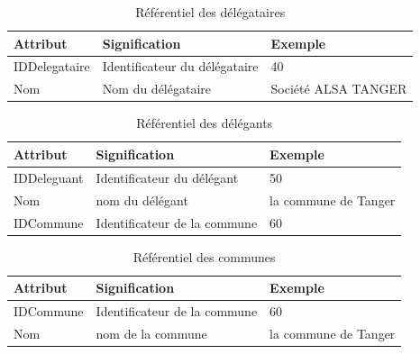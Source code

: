 \documentclass[a4paper]{report}
\begin{document}
\begin{doublespace}
	\begin{table}[H]
		\begin{center}
			\begin{tabularx}{17.5cm}{|X|X|X|}
				\hline
				\textbf{Attribut} & \textbf{Signification}        &
				\textbf{Exemple}                                                        \\
				\hline
				IDDelegataire     & Identificateur du délégataire & 40                  \\
				\hline
				Nom               & Nom du délégataire            & Société ALSA TANGER \\
				\hline
			\end{tabularx}
			\caption{Référentiel des délégataires}
		\end{center}
	\end{table}

	\begin{table}[H]
		\begin{center}
			\begin{tabularx}{17.5cm}{|X|X|X|}
				\hline
				\textbf{Attribut} & \textbf{Signification}       &
				\textbf{Exemple}                                                        \\
				\hline
				IDDeleguant       & Identificateur du délégant   & 50                   \\
				\hline
				Nom               & nom du délégant              & la commune de Tanger \\
				\hline
				IDCommune         & Identificateur de la commune & 60                   \\
				\hline
			\end{tabularx}
			\caption{Référentiel des délégants}
		\end{center}
	\end{table}

	\begin{table}[H]
		\begin{center}
			\begin{tabularx}{17.5cm}{|X|X|X|}
				\hline
				\textbf{Attribut} & \textbf{Signification}       &
				\textbf{Exemple}                                                        \\
				\hline
				IDCommune         & Identificateur de la commune & 60                   \\
				\hline
				Nom               & nom de la commune            & la commune de Tanger \\
				\hline
			\end{tabularx}
			\caption{Référentiel des communes}
		\end{center}
	\end{table}


\end{doublespace}
\end{document}
